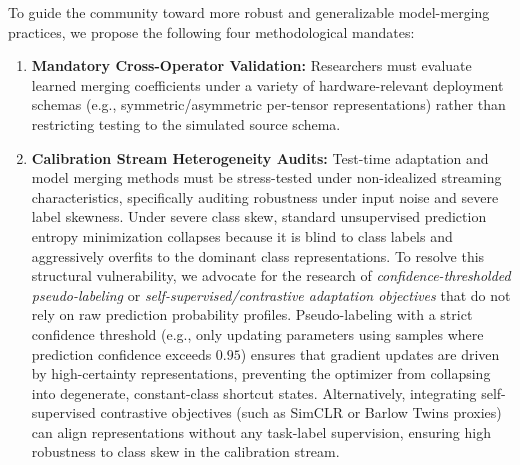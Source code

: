 To guide the community toward more robust and generalizable model-merging practices, we propose the following four methodological mandates:
\begin{enumerate}
    \item \textbf{Mandatory Cross-Operator Validation:} Researchers must evaluate learned merging coefficients under a variety of hardware-relevant deployment schemas (e.g., symmetric/asymmetric per-tensor representations) rather than restricting testing to the simulated source schema.
    \item \textbf{Calibration Stream Heterogeneity Audits:} Test-time adaptation and model merging methods must be stress-tested under non-idealized streaming characteristics, specifically auditing robustness under input noise and severe label skewness. Under severe class skew, standard unsupervised prediction entropy minimization collapses because it is blind to class labels and aggressively overfits to the dominant class representations. To resolve this structural vulnerability, we advocate for the research of \emph{confidence-thresholded pseudo-labeling} or \emph{self-supervised/contrastive adaptation objectives} that do not rely on raw prediction probability profiles. Pseudo-labeling with a strict confidence threshold (e.g., only updating parameters using samples where prediction confidence exceeds $0.95$) ensures that gradient updates are driven by high-certainty representations, preventing the optimizer from collapsing into degenerate, constant-class shortcut states. Alternatively, integrating self-supervised contrastive objectives (such as SimCLR or Barlow Twins proxies) can align representations without any task-label supervision, ensuring high robustness to class skew in the calibration stream.

\end{enumerate}
